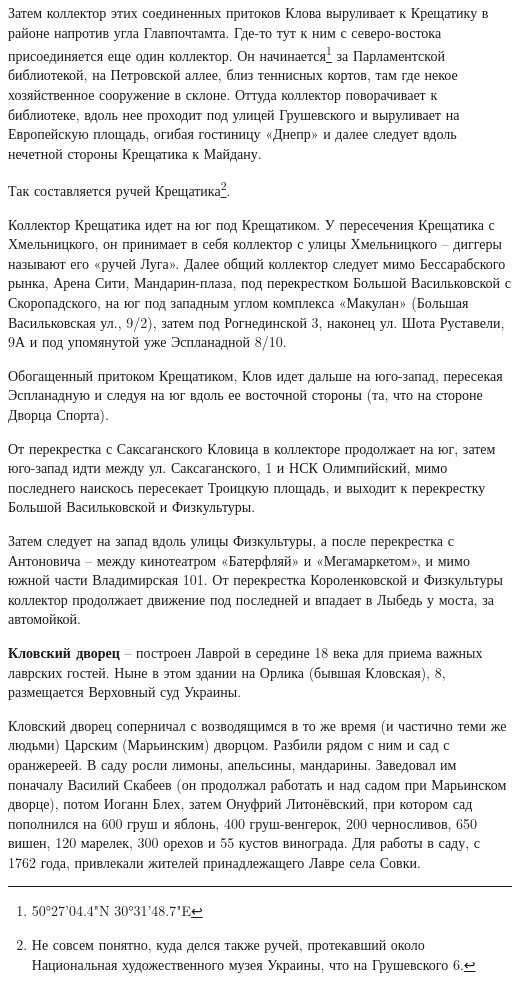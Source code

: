 Затем коллектор этих соединенных притоков Клова выруливает к Крещатику в районе напротив угла Главпочтамта. Где-то тут к ним с северо-востока присоединяется еще один коллектор. Он начинается\footnote{50°27'04.4"N 30°31'48.7"E} за Парламентской библиотекой, на Петровской аллее, близ теннисных кортов, там где некое хозяйственное сооружение в склоне. Оттуда коллектор поворачивает к библиотеке, вдоль нее проходит под улицей Грушевского и выруливает на Европейскую площадь, огибая гостиницу «Днепр» и далее следует вдоль нечетной стороны Крещатика к Майдану. 

Так составляется ручей Крещатика\footnote{Не совсем понятно, куда делся также ручей, протекавший около Национальная художественного музея Украины, что на Грушевского 6.}. 

Коллектор Крещатика идет на юг под Крещатиком. У пересечения Крещатика с Хмельницкого, он принимает в себя коллектор с улицы Хмельницкого – диггеры называют его «ручей Луга». Далее общий коллектор следует мимо Бессарабского рынка, Арена Сити, Мандар\-ин-плаза, под перекрестком Большой Васильковской с Скоропадского, на юг под западным углом комплекса «Макулан» (Большая Васильковская ул., 9/2), затем под Рогнединской 3, наконец ул. Шота Руставели, 9А и под упомянутой уже Эспланадной 8/10.

Обогащенный притоком Крещатиком, Клов идет дальше на юго-запад, пересекая Эспланадную и следуя на юг вдоль ее восточной стороны (та, что на стороне Дворца Спорта).

От перекрестка с Саксаганского Кловица в коллекторе продолжает на юг, затем юго-запад идти между ул. Саксаганского, 1 и НСК Олимпийский, мимо последнего наискось пересекает Троицкую площадь, и выходит к перекрестку Большой Васильковской и Физкультуры.

Затем следует на запад вдоль улицы Физкультуры, а после перекрестка с Антоновича – между кинотеатром «Батерфляй» и «Мегамаркетом», и мимо южной части Владимирская 101. От перекрестка Короленковской и Физкультуры коллектор продолжает движение под последней и впадает в Лыбедь у моста, за автомойкой.\\ 


\medskip

\textbf{Кловский дворец} – построен Лаврой в середине 18 века для приема важных лаврских гостей. Ныне в этом здании на Орлика (бывшая Кловская), 8, размещается Верховный суд Украины. 

Кловский дворец соперничал с возводящимся в то же время (и частично теми же людьми) Царским (Марьинским) дворцом. Разбили рядом с ним и сад с оранжереей. В саду росли лимоны, апельсины, мандарины. Заведовал им поначалу Василий Скабеев (он продолжал работать и над садом при Марьинском дворце), потом Иоганн Блех, затем Онуфрий Литонёвский, при котором сад пополнился на 600 груш и яблонь, 400 груш-венгерок, 200 черносливов, 650 вишен, 120 марелек, 300 орехов и 55 кустов винограда. Для работы в саду, с 1762 года, привлекали жителей принадлежащего Лавре села Совки.

